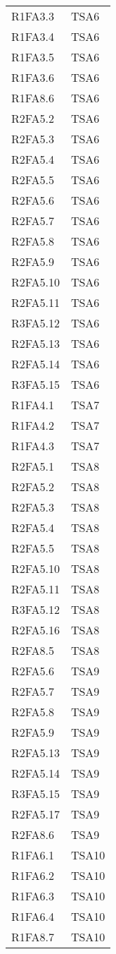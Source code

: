 {\begin{longtable}{C{4cm} C{4cm}}
R1FA3.3 & TSA6  \\
R1FA3.4 & TSA6  \\
R1FA3.5 & TSA6  \\
R1FA3.6 & TSA6  \\
R1FA8.6 & TSA6  \\
R2FA5.2 & TSA6  \\
R2FA5.3 & TSA6  \\
R2FA5.4 & TSA6  \\
R2FA5.5 & TSA6  \\
R2FA5.6 & TSA6  \\
R2FA5.7 & TSA6  \\
R2FA5.8 & TSA6  \\
R2FA5.9 & TSA6  \\
R2FA5.10 & TSA6  \\
R2FA5.11 & TSA6  \\
R3FA5.12 & TSA6  \\
R2FA5.13 & TSA6  \\
R2FA5.14 & TSA6  \\
R3FA5.15 & TSA6  \\

R1FA4.1 & TSA7  \\
R1FA4.2& TSA7  \\
R1FA4.3& TSA7  \\

R2FA5.1 & TSA8  \\
R2FA5.2 & TSA8  \\
R2FA5.3 & TSA8  \\
R2FA5.4 & TSA8  \\
R2FA5.5 & TSA8  \\
R2FA5.10 & TSA8  \\
R2FA5.11 & TSA8  \\
R3FA5.12 & TSA8  \\
R2FA5.16 & TSA8  \\
R2FA8.5 & TSA8  \\

R2FA5.6 & TSA9  \\
R2FA5.7 & TSA9  \\
R2FA5.8 & TSA9  \\
R2FA5.9 & TSA9  \\
R2FA5.13 & TSA9  \\
R2FA5.14 & TSA9  \\
R3FA5.15 & TSA9  \\
R2FA5.17 & TSA9  \\
R2FA8.6 & TSA9  \\

R1FA6.1 & TSA10  \\
R1FA6.2 & TSA10  \\
R1FA6.3 & TSA10  \\
R1FA6.4 & TSA10  \\
R1FA8.7 & TSA10  \\


\end{longtable}}
